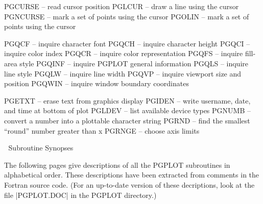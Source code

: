 {

PGCURSE -- read cursor position
PGLCUR -- draw a line using the cursor
PGNCURSE -- mark a set of points using the cursor
PGOLIN -- mark a set of points using the cursor


PGQCF -- inquire character font
PGQCH -- inquire character height
PGQCI -- inquire color index
PGQCR -- inquire color representation
PGQFS -- inquire fill-area style
PGQINF -- inquire PGPLOT general information
PGQLS -- inquire line style
PGQLW -- inquire line width
PGQVP -- inquire viewport size and position
PGQWIN -- inquire window boundary coordinates


PGETXT -- erase text from graphics display
PGIDEN -- write username, date, and time at bottom of plot
PGLDEV -- list available device types
PGNUMB -- convert a number into a plottable character string
PGRND -- find the smallest ``round'' number greater than x
PGRNGE -- choose axis limits
}

\beginsection Subroutine Synopses

The following pages give descriptions of all the PGPLOT subroutines
in alphabetical order.  These descriptions have been extracted from
comments in the Fortran source code.  (For an up-to-date version
of these decriptions, look at the file |PGPLOT.DOC| in the PGPLOT
directory.)

\raggedbottom
\vfill\eject


\endchapter

